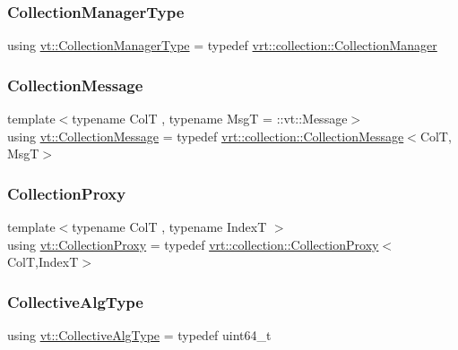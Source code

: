 \subsubsection{\texorpdfstring{Collection\+Manager\+Type}{CollectionManagerType}}
{\footnotesize\ttfamily using \hyperlink{namespacevt_a290f7e8941f9f411b54cdb15b6cea107}{vt\+::\+Collection\+Manager\+Type} = typedef \hyperlink{structvt_1_1vrt_1_1collection_1_1_collection_manager}{vrt\+::collection\+::\+Collection\+Manager}}

\mbox{\label{namespacevt_ae7700e12f79c0fec16964aab84838428}} 
\subsubsection{\texorpdfstring{Collection\+Message}{CollectionMessage}}
{\footnotesize\ttfamily template$<$typename ColT , typename MsgT  = \+::vt\+::\+Message$>$ \\
using \hyperlink{namespacevt_ae7700e12f79c0fec16964aab84838428}{vt\+::\+Collection\+Message} = typedef \hyperlink{structvt_1_1vrt_1_1collection_1_1_collection_message}{vrt\+::collection\+::\+Collection\+Message}$<$ColT, MsgT$>$}

\mbox{\label{namespacevt_a0d58a693bfb96e0ce5d145692a1a1f98}} 
\subsubsection{\texorpdfstring{Collection\+Proxy}{CollectionProxy}}
{\footnotesize\ttfamily template$<$typename ColT , typename IndexT $>$ \\
using \hyperlink{namespacevt_a0d58a693bfb96e0ce5d145692a1a1f98}{vt\+::\+Collection\+Proxy} = typedef \hyperlink{structvt_1_1vrt_1_1collection_1_1_collection_proxy}{vrt\+::collection\+::\+Collection\+Proxy}$<$ColT,IndexT$>$}

\mbox{\label{namespacevt_a5ffcf8e168b77b0f36e11b616049a1cf}} 
\subsubsection{\texorpdfstring{Collective\+Alg\+Type}{CollectiveAlgType}}
{\footnotesize\ttfamily using \hyperlink{namespacevt_a5ffcf8e168b77b0f36e11b616049a1cf}{vt\+::\+Collective\+Alg\+Type} = typedef uint64\+\_\+t}



